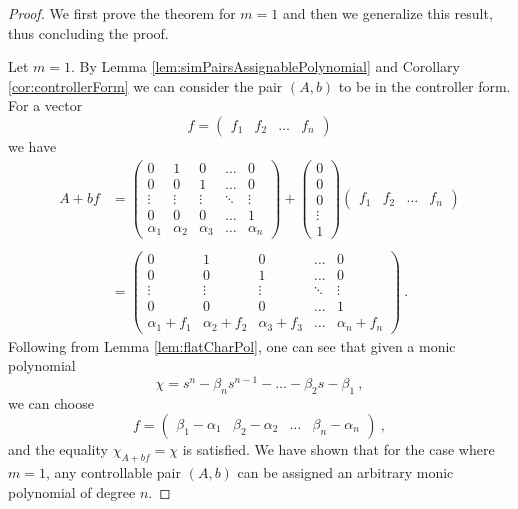 \begin{proof}
    We first prove the theorem for $m=1$ and then we generalize this result, thus concluding the proof.

    Let $m=1$. By Lemma \ref{lem:simPairsAssignablePolynomial} and Corollary \ref{cor:controllerForm} we can consider the pair $(A,b)$ to be in the controller form. For a vector 
    \begin{equation*}
        f=\begin{pmatrix}
            f_1&f_2&\ldots&f_n
        \end{pmatrix}
    \end{equation*}
    we have 
    \begin{align*}
        A+bf&=
        \begin{pmatrix}
			0 & 1 & 0 & \ldots & 0 \\
			0 & 0 & 1 & \ldots & 0 \\
			\vdots & \vdots & \vdots & \ddots & \vdots \\
			0 & 0 & 0 & \ldots & 1 \\
			\alpha_1 & \alpha_2 & \alpha_3 & \ldots & \alpha_n
        \end{pmatrix}
        +
        \begin{pmatrix}
            0 \\
            0 \\
            0 \\
            \vdots \\
            1
        \end{pmatrix}
        \begin{pmatrix}
            f_1&f_2&\ldots&f_n
        \end{pmatrix}
        \\
        \\
        &=
        \begin{pmatrix}
			0 & 1 & 0 & \ldots & 0 \\
			0 & 0 & 1 & \ldots & 0 \\
			\vdots & \vdots & \vdots & \ddots & \vdots \\
			0 & 0 & 0 & \ldots & 1 \\
            \alpha_1+f_1 & \alpha_2+f_2 & \alpha_3+f_3 & \ldots & \alpha_n+f_n
        \end{pmatrix}\ .
    \end{align*}
    Following from Lemma \ref{lem:flatCharPol}, one can see that given a monic polynomial
    $$\chi=s^n-\beta_ns^{n-1}-\ldots-\beta_2s-\beta_1\ ,$$
    we can choose
    $$f=\begin{pmatrix}
        \beta_1-\alpha_1&\beta_2-\alpha_2&\ldots&\beta_n-\alpha_n
    \end{pmatrix}\ ,$$
    and the equality $\chi_{A+bf}=\chi$ is satisfied. We have shown that for the case where $m=1$, any controllable pair $(A,b)$ can be assigned an arbitrary monic polynomial of degree $n$.


\end{proof}

